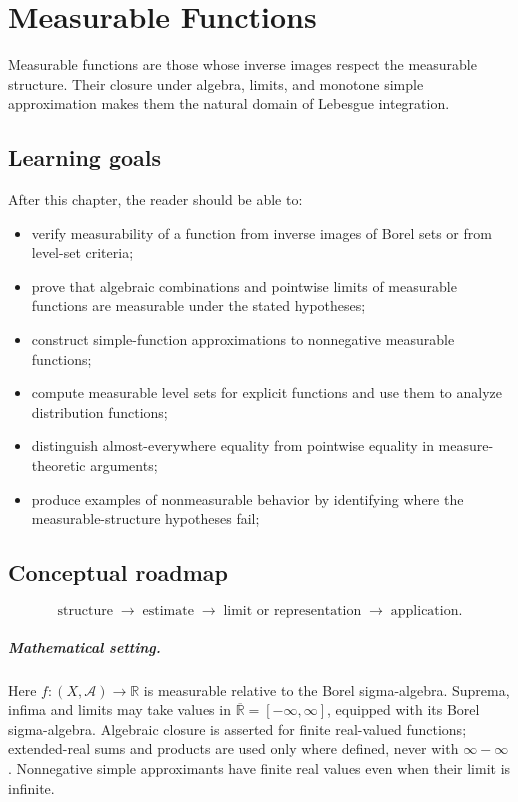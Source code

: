 \chapter{Measurable Functions}
\label{ch:iii02}

Measurable functions are those whose inverse images respect the measurable structure. Their closure under algebra, limits, and monotone simple approximation makes them the natural domain of Lebesgue integration.

\section*{Learning goals}
After this chapter, the reader should be able to:
\begin{itemize}
\item verify measurability of a function from inverse images of Borel sets or from level-set criteria;
\item prove that algebraic combinations and pointwise limits of measurable functions are measurable under the stated hypotheses;
\item construct simple-function approximations to nonnegative measurable functions;
\item compute measurable level sets for explicit functions and use them to analyze distribution functions;
\item distinguish almost-everywhere equality from pointwise equality in measure-theoretic arguments;
\item produce examples of nonmeasurable behavior by identifying where the measurable-structure hypotheses fail;
\end{itemize}
\section*{Conceptual roadmap}
\[
\boxed{\text{structure}\;\longrightarrow\;\text{estimate}\;\longrightarrow\;\text{limit or representation}\;\longrightarrow\;\text{application}.}
\]

\paragraph{Mathematical setting.}
Here $f:(X,\mathcal A)\to\mathbb R$ is measurable relative to the Borel sigma-algebra. Suprema, infima and limits may take values in $\overline{\mathbb R}=[-\infty,\infty]$, equipped with its Borel sigma-algebra. Algebraic closure is asserted for finite real-valued functions; extended-real sums and products are used only where defined, never with $\infty-\infty$. Nonnegative simple approximants have finite real values even when their limit is infinite.

